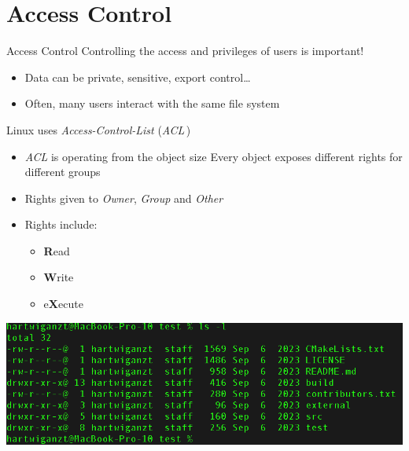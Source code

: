 \documentclass{setbeamer}
\begin{document}
\section{Access Control}

\begin{frame}{Access Control}
    Controlling the access and privileges of users is important!
    
    \begin{itemize}
        \item Data can be private, sensitive, export control\dots
        \item Often, many users interact with the same file system
    \end{itemize}

    \pause
    \vspace{0.3cm}

       Linux uses \emph{Access-Control-List} (\emph{ACL}\,)
    \begin{itemize}
        \item \emph{ACL} is operating from the object size {\Large \MVRightarrow} Every object exposes different rights for different groups
        \item Rights given to \emph{Owner}, \emph{Group} and \emph{Other}
        \item Rights include:
        \begin{itemize}
            \item \textbf{R}ead 
            \item \textbf{W}rite
            \item e\textbf{X}ecute
        \end{itemize}
    \end{itemize}

    \pause
    \vspace{-1.5cm}
    \hspace{5cm}
	\includegraphics[width=.6\columnwidth]{resources/ls-l.png}

\end{frame}
\end{document}
